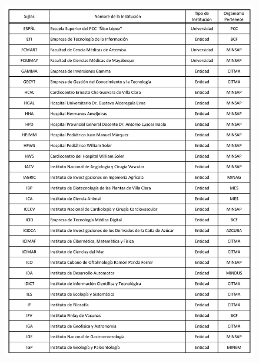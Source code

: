 \begin{figure}
    \centering
    \includegraphics[width=\linewidth]{Figure/anexo/4}\label{fig:figure4}
\end{figure}
